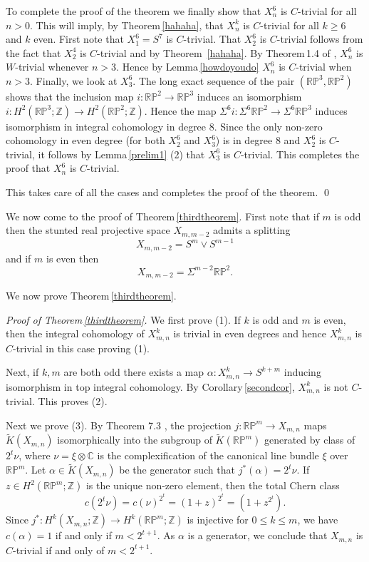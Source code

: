 \documentclass[12pt,reqno]{amsart}
\numberwithin{equation}{subsection}
\theoremstyle{definition}
\begin{document}
 

To complete the proof of the theorem we finally show that $X^6_n$ is $C$-trivial for all $n>0$. This will imply, by Theorem\,\ref{hahaha}, that $X^k_n$ is $C$-trivial for all $k\geq 6$ and $k$ even.  
First note that $X^6_1=S^7$ is $C$-trivial. That $X^6_2$ is $C$-trivial follows from the fact that $X^4_2$ is $C$-trivial and by Theorem\,  \ref{hahaha}.
By Theorem\,1.4 of \cite{tanaka}, $X^6_n$ is $W$-trivial whenever $n>3$. 
Hence by Lemma\,\ref{howdoyoudo} $X^6_n$ is $C$-trivial when $n>3$. Finally, we look at $X^6_3$. The long exact sequence of the pair $(\mathbb R\mathbb P^3,\mathbb R\mathbb P^2)$ shows that 
the inclusion map $i:\mathbb R\mathbb P^2\longrightarrow \mathbb R\mathbb P^3$ induces an isomorphism $i:H^2(\mathbb R\mathbb P^3;\mathbb Z)\longrightarrow H^2(\mathbb R\mathbb P^2;\mathbb Z)$. Hence the map $\Sigma^6i:\Sigma^6\mathbb R\mathbb P^2\longrightarrow \Sigma^6\mathbb R\mathbb P^3$ induces isomorphism in integral cohomology in degree $8$. Since the only non-zero cohomology in even degree (for both $X^6_2$ and $X^6_3$) is in 
degree $8$ and $X^6_2$ is $C$-trivial, it follows by Lemma\,\ref{prelim1} (2) that $X^6_3$ is $C$-trivial. This completes the proof that $X^6_n$ is $C$-trivial.    

This takes care of all the cases and completes the proof of the theorem. \qed 

We now come to the proof of Theorem\,\ref{thirdtheorem}. First note that if $m$ is odd then the stunted real projective space $X_{m,m-2}$ 
admits a splitting 
$$X_{m,m-2}=S^m\vee S^{m-1}$$
and if $m$ is even then 
$$X_{m,m-2}=\Sigma^{m-2}\mathbb R\mathbb P^2.$$ 

We now prove Theorem\,\ref{thirdtheorem}. 

{\em Proof of Theorem\,\ref{thirdtheorem}.} We first prove (1). If $k$ is odd and $m$ is even, then the integral cohomology of $X^k_{m,n}$ is trivial in even degrees and hence $X^k_{m,n}$ is $C$-trivial in this case proving (1). 

Next, if $k,m$ are both odd there exists a map $\alpha:X^k_{m,n}\longrightarrow S^{k+m}$ inducing isomorphism in top integral cohomology. By Corollary\,\ref{secondcor}, $X^k_{m,n}$ is not $C$-trivial. This proves (2). 

Next we prove (3). By Theorem 7.3 \cite{adams}, the projection $j:\mathbb R\mathbb P^m \rightarrow X_{m,n}$ maps $\widetilde{K}(X_{m,n})$ isomorphically into the subgroup of $\widetilde{K}(\mathbb R\mathbb P^m)$ generated by class of $2^t\nu$, where $\nu = \xi \otimes \mathbb C$ is the complexification of the canonical line bundle $\xi$ over $\mathbb R \mathbb P^m$. Let $\alpha \in \widetilde{K}(X_{m,n})$ be the generator such that $j^*(\alpha) = 2^t\nu$.
If $z  \in H^2(\mathbb R \mathbb P^m;\mathbb Z)$ is the unique non-zero element, then the total Chern class
$$c(2^t\nu) = c(\nu)^{2^t} = (1+z)^{2^t} = (1+z^{2^t}).$$
Since $j^*:H^k(X_{m,n};\mathbb Z) \rightarrow H^k(\mathbb R \mathbb P^m;\mathbb Z)$ is injective  for $0 \leq k \leq m$, we have $c(\alpha) = 1$ if and only if $m < 2^{t+1}$. As $\alpha$ is a generator, we conclude that $X_{m,n}$ is $C$-trivial if and only of $m< 2^{t+1}$.
\end{document}
